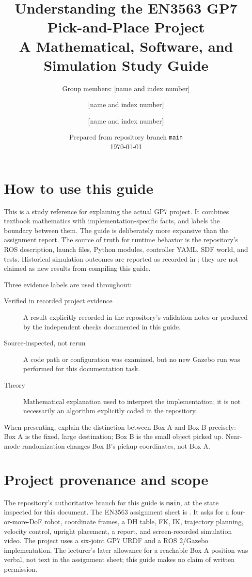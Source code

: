 \documentclass[11pt,oneside]{book}
\title{Understanding the EN3563 GP7 Pick-and-Place Project\\[0.5em]
\large A Mathematical, Software, and Simulation Study Guide}
\author{Group members: [name and index number] \and [name and index number] \and [name and index number]}
\date{Prepared from repository branch \texttt{main}\\[0.4em]\today}
\DeclareRobustCommand{\file}[1]{\path{#1}}
\begin{document}
\frontmatter
\maketitle
\chapter*{How to use this guide}
This is a study reference for explaining the actual GP7 project. It combines
textbook mathematics with implementation-specific facts, and labels the
boundary between them. The guide is deliberately more expansive than the
assignment report. The source of truth for runtime behavior is the repository's
ROS description, launch files, Python modules, controller YAML, SDF world, and
tests. Historical simulation outcomes are reported as recorded in
\file{docs/validation.md}; they are not claimed as new results from compiling
this guide.

Three evidence labels are used throughout:
\begin{description}
  \item[Verified in recorded project evidence] A result explicitly recorded in
  the repository's validation notes or produced by the independent checks
  documented in this guide.
  \item[Source-inspected, not rerun] A code path or configuration was examined,
  but no new Gazebo run was performed for this documentation task.
  \item[Theory] Mathematical explanation used to interpret the implementation;
  it is not necessarily an algorithm explicitly coded in the repository.
\end{description}

When presenting, explain the distinction between Box A and Box B precisely:
Box A is the fixed, large destination; Box B is the small object picked up.
Near-mode randomization changes Box B's pickup coordinates, not Box A.

\chapter*{Project provenance and scope}
The repository's authoritative branch for this guide is \texttt{main}, at the
state inspected for this document. The EN3563 assignment sheet is
\file{Task_sheet.pdf}. It asks for a four-or-more-DoF robot, coordinate frames,
a DH table, FK, IK, trajectory planning, velocity control, upright placement,
a report, and screen-recorded simulation video. The project uses a six-joint
GP7 URDF and a ROS 2/Gazebo implementation. The lecturer's later allowance for
a reachable Box A position was verbal, not text in the assignment sheet; this
guide makes no claim of written permission.
\end{document}
